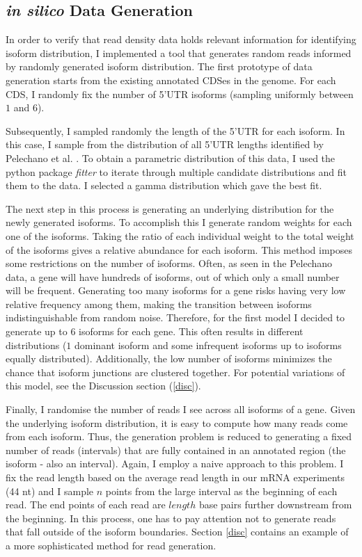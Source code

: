 \documentclass[12pt]{article}
\begin{document}


\subsection{\textit{in silico} Data Generation}

In order to verify that read density data holds relevant information for identifying isoform distribution, I implemented a tool that generates random reads informed by randomly generated isoform distribution. The first prototype of data generation starts from the existing annotated CDSes in the genome. For each CDS, I randomly fix the number of 5'UTR isoforms (sampling uniformly between $1$ and $6$). 

Subsequently, I sampled randomly the length of the 5'UTR for each isoform. In this case, I sample from the distribution of all 5'UTR lengths identified by Pelechano et al. \cite{Pelechano2013}. To obtain a parametric distribution of this data, I used the python package \textit{fitter} to iterate through multiple candidate distributions and fit them to the data. I selected a gamma distribution \cite{gamma} which gave the best fit. 

The next step in this process is generating an underlying distribution for the newly generated isoforms. To accomplish this I generate random weights for each one of the isoforms. Taking the ratio of each individual weight to the total weight of the isoforms gives a relative abundance for each isoform. This method imposes some restrictions on the number of isoforms. Often, as seen in the Pelechano data, a gene will have hundreds of isoforms, out of which only a small number will be frequent. Generating too many isoforms for a gene risks having very low relative frequency among them, making the transition between isoforms indistinguishable from random noise. Therefore, for the first model I decided to generate up to $6$ isoforms for each gene. This often results in different distributions ($1$ dominant isoform and some infrequent isoforms up to isoforms equally distributed). Additionally, the low number of isoforms minimizes the chance that isoform junctions are clustered together. For potential variations of this model, see the Discussion section (\ref{disc}).

Finally, I randomise the number of reads I see across all isoforms of a gene. Given the underlying isoform distribution, it is easy to compute how many reads come from each isoform. Thus, the generation problem is reduced to generating a fixed number of reads (intervals) that are fully contained in an annotated region (the isoform - also an interval). Again, I employ a naive approach to this problem. I fix the read length based on the average read length in our mRNA experiments (44 nt) and I sample $n$ points from the large interval as the beginning of each read. The end points of each read are $length$ base pairs further downstream from the beginning. In this process, one has to pay attention not to generate reads that fall outside of the isoform boundaries. Section \ref{disc} contains an example of a more sophisticated method for read generation.  
\end{document}

